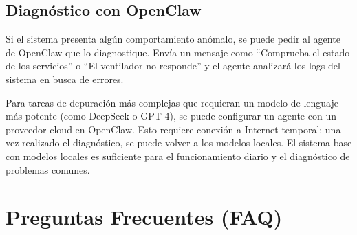 \subsection{Diagnóstico con OpenClaw}
Si el sistema presenta algún comportamiento anómalo, se puede pedir al agente de OpenClaw que lo diagnostique. Envía un mensaje como ``Comprueba el estado de los servicios'' o ``El ventilador no responde'' y el agente analizará los logs del sistema en busca de errores.

Para tareas de depuración más complejas que requieran un modelo de lenguaje más potente (como DeepSeek o GPT-4), se puede configurar un agente con un proveedor cloud en OpenClaw. Esto requiere conexión a Internet temporal; una vez realizado el diagnóstico, se puede volver a los modelos locales. El sistema base con modelos locales es suficiente para el funcionamiento diario y el diagnóstico de problemas comunes.

\section{Preguntas Frecuentes (FAQ)}


